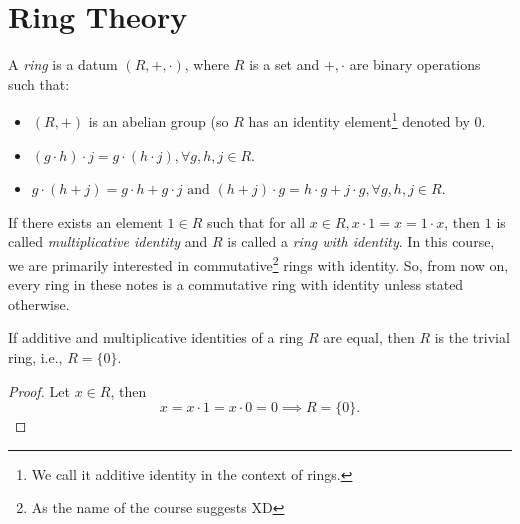 \section{Ring Theory}
\begin{definition}[Ring]
    A \textit{ring} is a datum \((R, +, \cdot)\), where \(R\) is a set and \(+, \cdot\) are binary operations such that:
    \begin{itemize}
        \item \((R, +)\) is an abelian group (so \(R\) has an identity element\footnote{We call it additive identity in the context of rings.} denoted by \(0\).
        \item \((g \cdot h) \cdot j = g \cdot (h \cdot j), \forall g, h, j \in R\).
        \item \(g \cdot (h + j) = g \cdot h + g \cdot j \text{ and } (h + j) \cdot g = h \cdot g + j \cdot g, \forall g, h, j \in R\).
    \end{itemize}
\end{definition}
If there exists an element \(1 \in R\) such that for all \(x \in R, x \cdot 1 = x = 1 \cdot x\), then \(1\) is called \textit{multiplicative identity} and \(R\) is called a \textit{ring with identity}. In this course, we are primarily interested in commutative\footnote{As the name of the course suggests XD} rings with identity. So, from now on, every ring in these notes is a commutative ring with identity unless stated otherwise. 
\begin{proposition}
    If additive and multiplicative identities of a ring \(R\) are equal, then \(R\) is the trivial ring, i.e., \(R = \{0\}\).
\end{proposition}
\begin{proof}
Let \(x \in R\), then \[x = x \cdot 1 = x \cdot 0 = 0 \implies R = \{0\}.\]
\end{proof}
